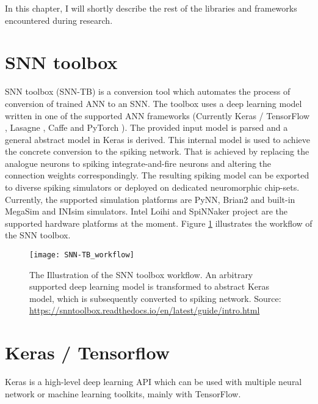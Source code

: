 In this chapter, I will shortly describe the rest of the libraries and frameworks encountered during research.

\section{SNN toolbox}
SNN toolbox (SNN-TB) \cite{rueckauerConversionContinuousValuedDeep2017} is a conversion tool which automates the process of conversion of trained ANN to an SNN. The toolbox uses a deep learning model written in one of the supported ANN frameworks (Currently Keras / TensorFlow \cite{cholletKeras15}, Lasagne \cite{sanderdielemanLasagneFirst15}, Caffe \cite{jiaCaffeConvolutional14} and PyTorch \cite{paszkePyTorchImperative19}). The provided input model is parsed and a general abstract model in Keras is derived. This internal model is used to achieve the concrete conversion to the spiking network. That is achieved by replacing the analogue neurons to spiking integrate-and-fire neurons and altering the connection weights correspondingly. The resulting spiking model can be exported to diverse spiking simulators or deployed on dedicated neuromorphic chip-sets. Currently, the supported simulation platforms are PyNN, Brian2 and built-in MegaSim and INIsim simulators. Intel Loihi and SpiNNaker project are the supported hardware platforms at the moment. Figure \ref{fig:snn-tb_workflow} illustrates the workflow of the SNN toolbox.

\begin{figure}[htbp]
    \centering
    \texttt{[image: SNN-TB\_workflow]}
    \caption{The Illustration of the SNN toolbox workflow. An arbitrary supported deep learning model is transformed to abstract Keras model, which is subsequently converted to spiking network. Source: \url{https://snntoolbox.readthedocs.io/en/latest/guide/intro.html}}
    \label{fig:snn-tb_workflow}
\end{figure}

\section{Keras / Tensorflow}
Keras is a high-level deep learning API which can be used with multiple neural network or machine learning toolkits, mainly with TensorFlow.